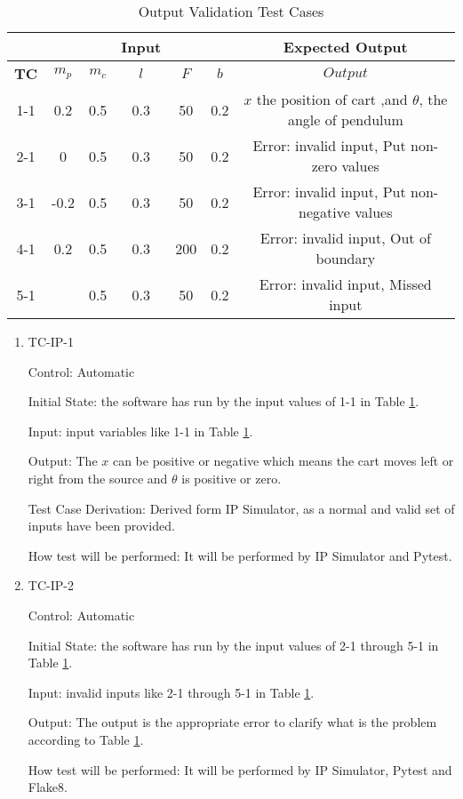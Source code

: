 \documentclass[12pt, titlepage]{article}
\begin{document}
\begin{table}
\caption{Output Validation Test Cases}\label{tbl_outValidation}
\vspace*{2mm}
 \begin{tabular}{|c|c c c c c| c|} 
 \hline
    & &&\textbf{Input}&&     & \textbf{Expected Output} \\ \hline

\textbf{TC} &   $m_p$ & $m_c$ & $l$ & $F$ & $b$  &   $Output$ \\ \hline
1-1 &0.2 & 0.5& 0.3& 50& 0.2 &$x$ the position of cart ,and $\theta$, the angle of pendulum \\
 \hline
2-1 &0 & 0.5& 0.3& 50& 0.2 & Error: invalid input, Put non-zero values  \\
 \hline
3-1 &-0.2 & 0.5& 0.3& 50& 0.2& Error: invalid input, Put non-negative values\\
 \hline
4-1 & 0.2& 0.5& 0.3& 200& 0.2 & Error: invalid input, Out of boundary \\
 \hline
5-1 & & 0.5& 0.3& 50& 0.2 & Error: invalid input, Missed input \\
  \hline
\end{tabular}

\end{table}		

\begin{enumerate}

\item{TC-IP-1}

Control: Automatic
					
Initial State: the software has run by the input values of 1-1 in Table \ref{tbl_outValidation}.
					
Input: input variables like 1-1 in Table \ref{tbl_outValidation}.
					
Output: The $x$ can be positive or negative which means the cart moves left or right from the source and $\theta$ is positive or zero.

Test Case Derivation: Derived form IP Simulator, as a normal and valid set of inputs have been provided.
					
How test will be performed: It will be performed by IP Simulator and Pytest.

\item{TC-IP-2}

Control: Automatic
					
Initial State: the software has run by the input values of 2-1 through 5-1 in Table \ref{tbl_outValidation}.
					
Input: invalid inputs like 2-1 through 5-1 in Table \ref{tbl_outValidation}.
					
Output: The output is the appropriate error to clarify what is the problem according to Table \ref{tbl_outValidation}.
					
How test will be performed:  It will be performed by IP Simulator, Pytest and Flake8.
				

\end{enumerate}
\end{document}
